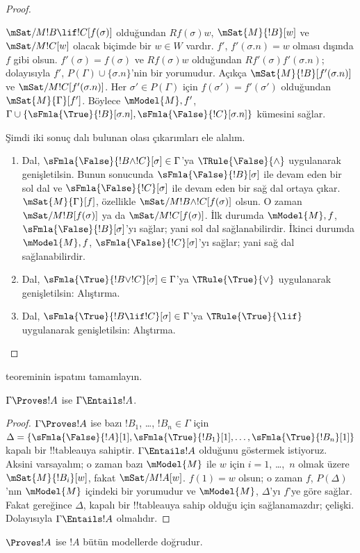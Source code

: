 \begin{proof}
\begin{enumerate}
  $\mSat/{M}{!B \lif !C}[f(\sigma)]$ olduğundan $Rf(\sigma)w$,
  $\mSat{M}{!B}[w]$ ve $\mSat/{M}{!C}[w]$ olacak biçimde bir $w \in W$
  vardır. $f'$, $f'(\sigma.n)=w$ olması dışında $f$ gibi olsun.
  $f'(\sigma)=f(\sigma)$ ve $Rf(\sigma)w$ olduğundan
  $Rf'(\sigma)f'(\sigma.n)$; dolayısıyla $f'$,
  $P(\Gamma) \cup \{\sigma.n\}$'nin bir yorumudur. Açıkça
  $\mSat{M}{!B}[f'(\sigma.n)]$ ve $\mSat/{M}{!C}[f'(\sigma.n)]$.
  Her $\sigma' \in P(\Gamma)$ için $f(\sigma')=f'(\sigma')$ olduğundan
  $\mSat{M}{\Gamma}[f']$. Böylece $\mModel{M},f'$,
  $\Gamma \cup \{\sFmla{\True}{!B}[\sigma.n],
  \sFmla{\False}{!C}[\sigma.n]\}$ kümesini sağlar.
\end{enumerate}
Şimdi iki sonuç dalı bulunan olası çıkarımları ele alalım.
\begin{enumerate}
\item Dal, $\sFmla{\False}{!B \land !C}[\sigma] \in \Gamma$'ya
  $\TRule{\False}{\land}$ uygulanarak genişletilsin. Bunun sonucunda
  $\sFmla{\False}{!B}[\sigma]$ ile devam eden bir sol dal ve
  $\sFmla{\False}{!C}[\sigma]$ ile devam eden bir sağ dal ortaya çıkar.
  $\mSat{M}{\Gamma}[f]$, özellikle
  $\mSat/{M}{!B \land !C}[f(\sigma)]$ olsun. O zaman
  $\mSat/{M}{!B}[f(\sigma)]$ ya da $\mSat/{M}{!C}[f(\sigma)]$. İlk durumda
  $\mModel{M},f$, $\sFmla{\False}{!B}[\sigma]$'yı sağlar; yani sol dal
  sağlanabilirdir. İkinci durumda $\mModel{M},f$,
  $\sFmla{\False}{!C}[\sigma]$'yı sağlar; yani sağ dal sağlanabilirdir.
\item Dal, $\sFmla{\True}{!B \lor !C}[\sigma] \in \Gamma$'ya
    $\TRule{\True}{\lor}$ uygulanarak genişletilsin: Alıştırma.
\item Dal, $\sFmla{\True}{!B \lif !C}[\sigma] \in \Gamma$'ya
    $\TRule{\True}{\lif}$ uygulanarak genişletilsin: Alıştırma.
\end{enumerate}
\end{proof}

\begin{prob}
 teoreminin ispatını tamamlayın.
\end{prob}

\begin{cor}
$\Gamma \Proves !A$ ise $\Gamma \Entails !A$.
\end{cor}

\begin{proof}
  $\Gamma \Proves !A$ ise bazı $!B_1$, \dots, $!B_n \in \Gamma$ için
  $\Delta = \{\sFmla{\False}{!A}[1], \sFmla{\True}{!B_1}[1],
  \dots, \sFmla{\True}{!B_n}[1]\}$ kapalı bir !!{tableau}{}ya sahiptir.
  $\Gamma \Entails !A$ olduğunu göstermek istiyoruz. Aksini varsayalım; o
  zaman bazı $\mModel{M}$ ile $w$ için $i=1$, \dots,~$n$ olmak üzere
  $\mSat{M}{!B_i}[w]$, fakat $\mSat/{M}{!A}[w]$. $f(1)=w$ olsun; o zaman
  $f$, $P(\Delta)$'nın $\mModel{M}$ içindeki bir yorumudur ve $\mModel{M}$,
  $\Delta$'yı $f$'ye göre sağlar. Fakat 
  gereğince $\Delta$, kapalı bir !!{tableau}{}ya sahip olduğu için sağlanamazdır;
  çelişki. Dolayısıyla $\Gamma \Entails !A$ olmalıdır.
\end{proof}

\begin{cor}
$\Proves !A$ ise $!A$ bütün modellerde doğrudur.
\end{cor}

